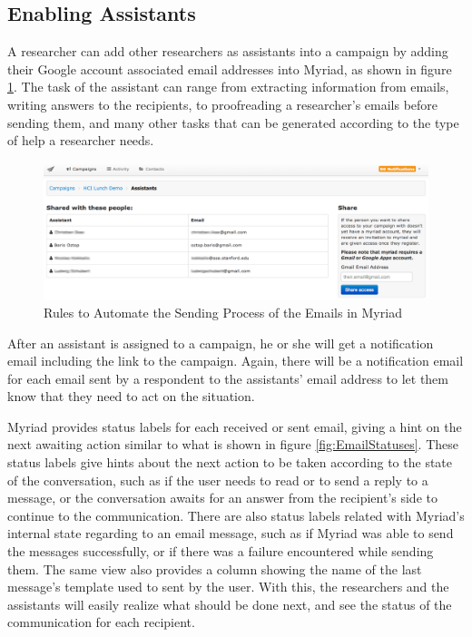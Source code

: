 \subsection{Enabling Assistants}
\label{subsec:5.2.6:EnabAssi}

A researcher can add other researchers as assistants into a campaign by adding their Google account associated email addresses into Myriad, as shown in figure \ref{fig:AddAssistants}. The task of the assistant can range from extracting information from emails, writing answers to the recipients, to proofreading a researcher's emails before sending them, and many other tasks that can be generated according to the type of help a researcher needs.

\clearpage

\begin{figure}[htbp]
	\centering
	\includegraphics[width=1.00\textwidth]{imgs/AddAssistants.png}
	\caption[Rules to Automate the Sending Process of the Emails in Myriad]{Rules to Automate the Sending Process of the Emails in Myriad}
	\label{fig:AddAssistants}
\end{figure}

After an assistant is assigned to a campaign, he or she will get a notification email including the link to the campaign. Again, there will be a notification email for each email sent by a respondent to the assistants' email address to let them know that they need to act on the situation.
\vspace{1cm}

Myriad provides status labels for each received or sent email, giving a hint on the next awaiting action similar to what is shown in figure \ref{fig:EmailStatuses}. These status labels give hints about the next action to be taken according to the state of the conversation, such as if the user needs to read or to send a reply to a message, or the conversation awaits for an answer from the recipient's side to continue to the communication. There are also status labels related with Myriad's internal state regarding to an email message, such as if Myriad was able to send the messages successfully, or if there was a failure encountered while sending them. The same view also provides a column showing the name of the last message's template used to sent by the user. With this, the researchers and the assistants will easily realize what should be done next, and see the status of the communication for each recipient. 

